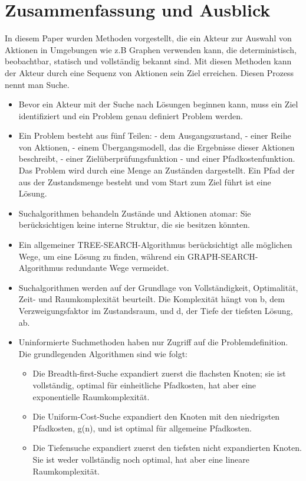 \chapter{Zusammenfassung und Ausblick}

In diesem Paper wurden Methoden vorgestellt, die ein Akteur zur Auswahl von Aktionen in Umgebungen wie z.B Graphen verwenden kann, 
die deterministisch, beobachtbar, statisch und vollständig bekannt sind. 
Mit diesen Methoden kann der Akteur durch eine Sequenz von Aktionen sein Ziel erreichen. Diesen Prozess nennt man Suche.
\begin{itemize}
    \item Bevor ein Akteur mit der Suche nach Lösungen beginnen kann, muss ein Ziel identifiziert und ein Problem genau definiert Problem werden.
    \item Ein Problem besteht aus fünf Teilen: - dem Ausgangszustand, - einer Reihe von Aktionen, - einem Übergangsmodell, das die Ergebnisse dieser Aktionen beschreibt, - einer Zielüberprüfungsfunktion - und einer Pfadkostenfunktion. Das Problem wird durch eine Menge an Zuständen dargestellt. Ein Pfad der aus der Zustandsmenge besteht und vom Start zum  Ziel führt ist eine Lösung.
    \item Suchalgorithmen behandeln Zustände und Aktionen atomar: Sie berücksichtigen keine interne Struktur, die sie besitzen könnten.
    \item Ein allgemeiner TREE-SEARCH-Algorithmus berücksichtigt alle möglichen Wege, um eine Lösung zu finden, während ein GRAPH-SEARCH-Algorithmus redundante Wege vermeidet.
    \item Suchalgorithmen werden auf der Grundlage von Vollständigkeit, Optimalität, Zeit- und Raumkomplexität beurteilt. Die Komplexität hängt von b, dem Verzweigungsfaktor im Zustandsraum, und d, der Tiefe der tiefsten Lösung, ab.
    \item Uninformierte Suchmethoden haben nur Zugriff auf die Problemdefinition. Die grundlegenden Algorithmen sind wie folgt:
    \begin{itemize}
        \item Die Breadth-first-Suche expandiert zuerst die flachsten Knoten; sie ist vollständig, optimal für einheitliche Pfadkosten, hat aber eine exponentielle Raumkomplexität.
        \item Die Uniform-Cost-Suche expandiert den Knoten mit den niedrigsten Pfadkosten, g(n), und ist optimal für allgemeine Pfadkosten.
        \item Die Tiefensuche expandiert zuerst den tiefsten nicht expandierten Knoten. Sie ist weder vollständig noch optimal, hat aber eine lineare Raumkomplexität.

\end{itemize}
\end{itemize}
